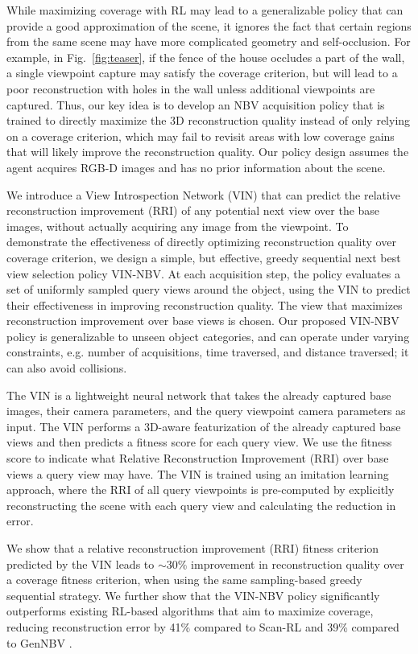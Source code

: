 While maximizing coverage with RL \cite{chen2024gennbv,peralta2020next} may lead to a generalizable policy that can provide a good approximation of the scene, it ignores the fact that certain regions from the same scene may have more complicated geometry and self-occlusion. For example, in Fig.~\ref{fig:teaser}, if the fence of the house occludes a part of the wall, a single viewpoint capture may satisfy the coverage criterion, but will lead to a poor reconstruction with holes in the wall unless additional viewpoints are captured. Thus, our key idea is to develop an NBV acquisition policy that is trained to directly maximize the 3D reconstruction quality instead of only relying on a coverage criterion, which may fail to revisit areas with low coverage gains that will likely improve the reconstruction quality. Our policy design assumes the agent acquires RGB-D images and has no prior information about the scene.


We introduce a View Introspection Network (VIN) that can predict the relative reconstruction improvement (RRI) of any potential next view over the base images, without actually acquiring any image from the viewpoint. To demonstrate the effectiveness of directly optimizing reconstruction quality over coverage criterion, we design a simple, but effective, greedy sequential next best view selection policy VIN-NBV. At each acquisition step, the policy evaluates a set of uniformly sampled query views around the object, using the VIN to predict their effectiveness in improving reconstruction quality. The view that maximizes reconstruction improvement over base views is chosen. Our proposed VIN-NBV policy is generalizable to unseen object categories, and can operate under varying constraints, e.g. number of acquisitions, time traversed, and distance traversed; it can also avoid collisions.

The VIN is a lightweight neural network that takes the already captured base images, their camera parameters, and the query viewpoint camera parameters as input. The VIN performs a 3D-aware featurization of the already captured base views and then predicts a fitness score for each query view. We use the fitness score to indicate what Relative Reconstruction Improvement (RRI) over base views a query view may have. The VIN is trained using an imitation learning approach, where the RRI of all query viewpoints is pre-computed by explicitly reconstructing the scene with each query view and calculating the reduction in error.

We show that a relative reconstruction improvement (RRI) fitness criterion predicted by the VIN leads to ${\sim} 30\%$ improvement in reconstruction quality over a coverage fitness criterion, when using the same sampling-based greedy sequential strategy. We further show that the VIN-NBV policy significantly outperforms existing RL-based algorithms that aim to maximize coverage, reducing reconstruction error by 41\% compared to Scan-RL \cite{peralta2020next} and 39\% compared to GenNBV \cite{chen2024gennbv}.